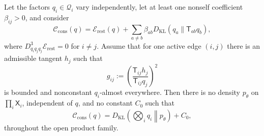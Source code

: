 \begin{theorem}
\label{thm:state_level_elbo_nogo}
Let the factors $q_i\in\mathcal{Q}_i$ vary independently, let at least one nonself coefficient $\beta_{ij}>0$, and consider
\begin{equation}
\mathcal{C}_{\mathrm{cons}}(q)
=\mathcal{E}_{\mathrm{rest}}(q)
+\sum_{a\ne b}\beta_{ab}D_{\mathrm{KL}}(q_a\|\mathsf{T}_{ab}q_b),
\label{eq:population_consensus_nogo_functional}
\end{equation}
where $D^3_{q_iq_jq_j}\mathcal{E}_{\mathrm{rest}}=0$ for $i\ne j$. Assume that for one active edge $(i,j)$ there is an admissible tangent $h_j$ such that
\begin{equation}
g_{ij}:=\left(\frac{\mathsf{T}_{ij}h_j}{\mathsf{T}_{ij}q_j}\right)^2
\label{eq:nogo_nondegenerate_tangent}
\end{equation}
is bounded and nonconstant $q_i$-almost everywhere. Then there is no density $p_\theta$ on $\prod_i\mathsf{X}_i$, independent of $q$, and no constant $C_0$ such that
\begin{equation}
\mathcal{C}_{\mathrm{cons}}(q)
=D_{\mathrm{KL}}\left(\bigotimes_iq_i\middle\|p_\theta\right)+C_0,
\label{eq:state_level_elbo_representation_impossible}
\end{equation}
throughout the open product family.
\end{theorem}

